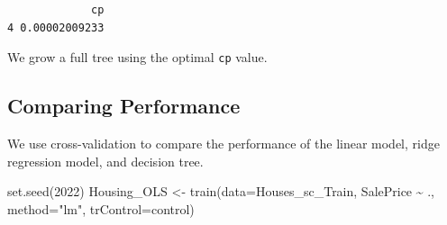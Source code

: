 \documentclass[
  letterpaper,
  DIV=11,
  numbers=noendperiod]{scrreprt}
\newenvironment{Shaded}{\begin{snugshade}}{\end{snugshade}}
\newcommand{\AttributeTok}[1]{\textcolor[rgb]{0.40,0.45,0.13}{#1}}
\newcommand{\DecValTok}[1]{\textcolor[rgb]{0.68,0.00,0.00}{#1}}
\newcommand{\FunctionTok}[1]{\textcolor[rgb]{0.28,0.35,0.67}{#1}}
\newcommand{\NormalTok}[1]{\textcolor[rgb]{0.00,0.23,0.31}{#1}}
\newcommand{\OtherTok}[1]{\textcolor[rgb]{0.00,0.23,0.31}{#1}}
\newcommand{\SpecialCharTok}[1]{\textcolor[rgb]{0.37,0.37,0.37}{#1}}
\newcommand{\StringTok}[1]{\textcolor[rgb]{0.13,0.47,0.30}{#1}}
\begin{document}
\begin{Shaded}
\end{Shaded}

\begin{verbatim}
             cp
4 0.00002009233
\end{verbatim}

We grow a full tree using the optimal \texttt{cp} value.

\begin{Shaded}
\end{Shaded}

\subsection{Comparing Performance}\label{comparing-performance}

We use cross-validation to compare the performance of the linear model,
ridge regression model, and decision tree.

\begin{Shaded}
\begin{Highlighting}[]
\FunctionTok{set.seed}\NormalTok{(}\DecValTok{2022}\NormalTok{)}
\NormalTok{Housing\_OLS }\OtherTok{\textless{}{-}} \FunctionTok{train}\NormalTok{(}\AttributeTok{data=}\NormalTok{Houses\_sc\_Train, SalePrice }\SpecialCharTok{\textasciitilde{}}\NormalTok{ .,  }\AttributeTok{method=}\StringTok{"lm"}\NormalTok{, }\AttributeTok{trControl=}\NormalTok{control)}
\end{Highlighting}
\end{Shaded}
\end{document}
